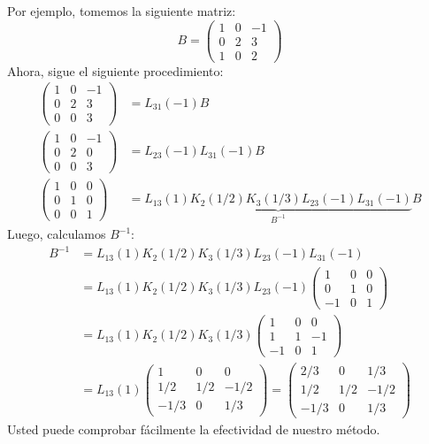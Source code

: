 \documentclass[11pt,oneside]{book}
\begin{document}
Por ejemplo, tomemos la siguiente matriz:
$$B=\begin{pmatrix}
1 &0 &-1\\ 0 &2 &3\\ 1 &0 &2
\end{pmatrix}$$
Ahora, sigue el siguiente procedimiento:
\begin{align*}
\begin{pmatrix}
1 &0 &-1\\ 0 &2 &3\\ 0 &0 &3
\end{pmatrix}&=L_{31}(-1)B\\
\begin{pmatrix}
1 &0 &-1\\ 0 &2 &0\\ 0 &0 &3
\end{pmatrix}&=L_{23}(-1)L_{31}(-1)B\\
\begin{pmatrix}
1 &0 &0\\ 0 &1 &0\\ 0 &0 &1
\end{pmatrix}&=\underbrace{L_{13}(1)K_2(1/2)K_3(1/3)L_{23}(-1)L_{31}(-1)}_{B^{-1}}B
\end{align*}
Luego, calculamos $B^{-1}$:
\begin{align*}
B^{-1}&=L_{13}(1)K_2(1/2)K_3(1/3)L_{23}(-1)L_{31}(-1)\\
&=L_{13}(1)K_2(1/2)K_3(1/3)L_{23}(-1)\begin{pmatrix}
1 &0 &0\\ 0 &1 &0\\ -1 &0 &1
\end{pmatrix}\\
&=L_{13}(1)K_2(1/2)K_3(1/3)\begin{pmatrix}
1 &0 &0\\ 1 &1 &-1\\ -1 &0 &1
\end{pmatrix}\\
&=L_{13}(1)\begin{pmatrix}
1 &0 &0\\ 1/2 &1/2 &-1/2\\ -1/3 &0 &1/3
\end{pmatrix}=\begin{pmatrix}
2/3 &0 &1/3\\ 1/2 &1/2 &-1/2\\ -1/3 &0 &1/3
\end{pmatrix}
\end{align*}
Usted puede comprobar fácilmente la efectividad de nuestro método.
\end{document}
